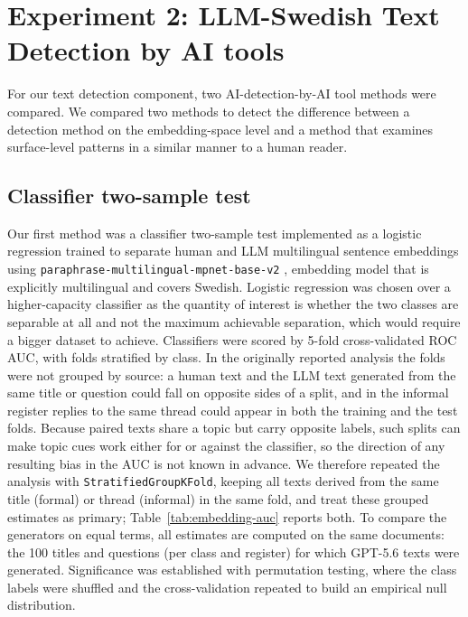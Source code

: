 \documentclass[thesis]{cluu}
\begin{document}
\section{Experiment 2: LLM-Swedish Text Detection by AI tools}

For our text detection component, two AI-detection-by-AI tool methods were
compared. We compared two methods to detect the difference between a detection method on the embedding-space level and a method that examines surface-level patterns in a similar manner to a human reader.

\subsection{Classifier two-sample test}
\label{sec:exp2-classifier}
Our first method was a classifier two-sample test \parencite{lopezpaz2017revisiting}
implemented as a logistic regression trained to separate human and LLM
multilingual sentence embeddings using
\texttt{paraphrase-multilingual-mpnet-base-v2} \parencite{reimers-2019-sentence-bert},
embedding model that is explicitly multilingual and covers Swedish.
Logistic regression was chosen over a higher-capacity classifier as the quantity
of interest is whether the two classes are separable at all and not the maximum
achievable separation, which would require a bigger dataset to achieve. Classifiers were scored by 5-fold cross-validated ROC AUC, with folds stratified by class. In the originally reported analysis the folds were not grouped by source: a human text and the LLM text generated from the same title or question could fall on opposite sides of a split, and in the informal register replies to the same thread could appear in both the training and the test folds. Because paired texts share a topic but carry opposite labels, such splits can make topic cues work either for or against the classifier, so the direction of any resulting bias in the AUC is not known in advance. We therefore repeated the analysis with \texttt{StratifiedGroupKFold}, keeping all texts derived from the same title (formal) or thread (informal) in the same fold, and treat these grouped estimates as primary; Table~\ref{tab:embedding-auc} reports both. To compare the generators on equal terms, all estimates are computed on the same documents: the 100 titles and questions (per class and register) for which GPT-5.6 texts were generated.
Significance was established with permutation testing,
where the class labels were shuffled and the cross-validation repeated to build
an empirical null distribution.
\end{document}
